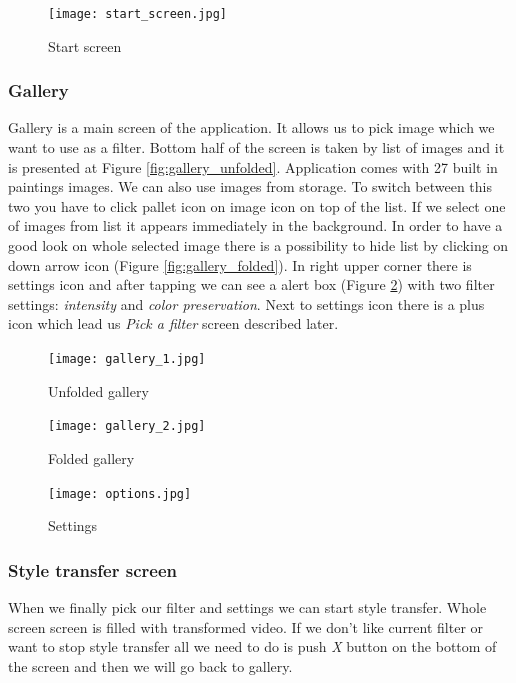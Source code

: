 \documentclass[../Main.tex]{subfiles}
\begin{document}
\begin{figure}[H]
    \centering
    \texttt{[image: start\_screen.jpg]}
    \caption{Start screen}
    \label{fig:start-screen}
\end{figure}


\subsubsection{Gallery}
Gallery is a main screen of the application. It allows us to pick image 
which we want to use as a filter. Bottom half of the screen is taken by list of images and it is presented at Figure \ref{fig:gallery_unfolded}.
Application comes with 27 built in paintings images. We can also use images from storage.
To switch between this two you have to click pallet icon on image icon on top of the list.
If we select one of images from list it appears immediately in the background.
In order to have a good look on whole selected image there is a possibility 
to hide list by clicking on down arrow icon (Figure \ref{fig:gallery_folded}).
In right upper corner there is settings icon and after tapping we can see a 
alert box (Figure \ref{fig:gallery_options}) with two filter settings:
\textit{intensity} and \textit{color preservation}.
Next to settings icon there is a plus icon which lead us \textit{Pick a filter} 
screen described later.

\begin{figure}[H]
        \texttt{[image: gallery\_1.jpg]}
        \caption{Unfolded gallery}\label{fig:gallery_unfolded}
    \endminipage\hfill
        \texttt{[image: gallery\_2.jpg]}
        \caption{Folded gallery}\label{fig:gallery_folded}
    \endminipage\hfill
        \texttt{[image: options.jpg]}
        \caption{Settings}\label{fig:gallery_options}
    \endminipage\hfill
\end{figure}


\subsubsection{Style transfer screen}
When we finally pick our filter and settings we can start style transfer.
Whole screen screen is filled with transformed video.
If we don't like current filter or want to stop style transfer all we need to 
do is push \textit{X} button on the bottom of the screen 
and then we will go back to gallery.
\end{document}
